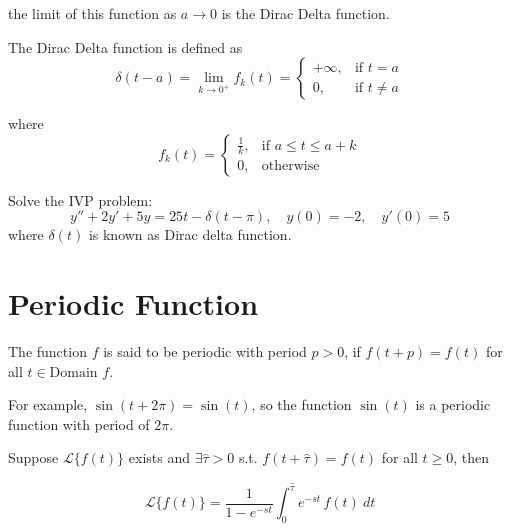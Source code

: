 the limit of this function as $a \to 0$ is the Dirac Delta function. 

\begin{definition}
    The Dirac Delta function is defined as 
    \begin{equation}
        \delta(t - a) = \lim_{k \to 0^+} f_k(t) = \begin{cases}
           +\infty, & \text{if } t = a\\
           0, & \text{if } t \neq a
        \end{cases}
    \end{equation}

    where 
    \begin{equation}
        f_k(t) = \begin{cases}
            \displaystyle \frac{1}{k}, & \text{if } a \leq t \leq a+k\\[0.75em]
            0, & \text{otherwise}
        \end{cases}
    \end{equation}
\end{definition}

\begin{example}
    Solve the IVP problem:
    \[
        y'' + 2y' + 5y = 25t - \delta(t - \pi), \quad y(0) = -2, \quad y'(0) = 5
    \]
    where $\delta(t)$ is known as Dirac delta function.
\end{example}

\section{Periodic Function}

\begin{definition}
    The function $f$ is said to be periodic with period $p > 0$, if $f(t + p) = f(t)$ 
    for all $t \in \text{Domain } f$.
\end{definition}

For example, $\sin(t + 2\pi) = \sin(t)$, so the function $\sin(t)$ is a periodic function 
with period of $2\pi$.

\begin{theorem}
    Suppose $\mathcal{L}\{f(t)\}$ exists and $\exists \hat{\tau} > 0$ s.t. $f(t + \hat{\tau}) = f(t)$ for all 
    $t \geq 0$, then 

    \begin{equation}
        \mathcal{L}\{f(t)\} = \frac{1}{1 - e^{-st}} \int_{0}^{\hat{\tau}} e^{-st}\, f(t)\> dt
    \end{equation}
\end{theorem}

